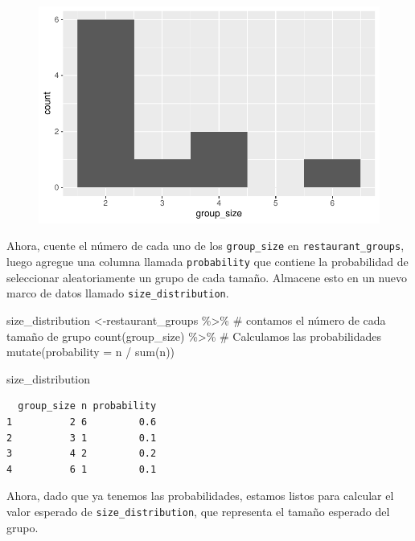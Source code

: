 \documentclass[
  letterpaper,
  DIV=11,
  numbers=noendperiod]{scrreprt}
\newenvironment{Shaded}{\begin{snugshade}}{\end{snugshade}}
\newcommand{\AttributeTok}[1]{\textcolor[rgb]{0.40,0.45,0.13}{#1}}
\newcommand{\CommentTok}[1]{\textcolor[rgb]{0.37,0.37,0.37}{#1}}
\newcommand{\FunctionTok}[1]{\textcolor[rgb]{0.28,0.35,0.67}{#1}}
\newcommand{\NormalTok}[1]{\textcolor[rgb]{0.00,0.23,0.31}{#1}}
\newcommand{\OtherTok}[1]{\textcolor[rgb]{0.00,0.23,0.31}{#1}}
\newcommand{\SpecialCharTok}[1]{\textcolor[rgb]{0.37,0.37,0.37}{#1}}
\begin{document}
\begin{figure}[H]

{\centering \includegraphics{summary_files/figure-pdf/unnamed-chunk-16-1.pdf}

}

\end{figure}

Ahora, cuente el número de cada uno de los \texttt{group\_size} en
\texttt{restaurant\_groups}, luego agregue una columna llamada
\texttt{probability} que contiene la probabilidad de seleccionar
aleatoriamente un grupo de cada tamaño. Almacene esto en un nuevo marco
de datos llamado \texttt{size\_distribution}.

\begin{Shaded}
\begin{Highlighting}[]
\NormalTok{size\_distribution }\OtherTok{\textless{}{-}}\NormalTok{restaurant\_groups }\SpecialCharTok{\%\textgreater{}\%}
  \CommentTok{\# contamos el número de cada tamaño de grupo}
  \FunctionTok{count}\NormalTok{(group\_size) }\SpecialCharTok{\%\textgreater{}\%}
  \CommentTok{\# Calculamos las probabilidades}
  \FunctionTok{mutate}\NormalTok{(}\AttributeTok{probability =}\NormalTok{ n }\SpecialCharTok{/} \FunctionTok{sum}\NormalTok{(n))}

\NormalTok{size\_distribution}
\end{Highlighting}
\end{Shaded}

\begin{verbatim}
  group_size n probability
1          2 6         0.6
2          3 1         0.1
3          4 2         0.2
4          6 1         0.1
\end{verbatim}

Ahora, dado que ya tenemos las probabilidades, estamos listos para
calcular el valor esperado de \texttt{size\_distribution}, que
representa el tamaño esperado del grupo.
\end{document}
